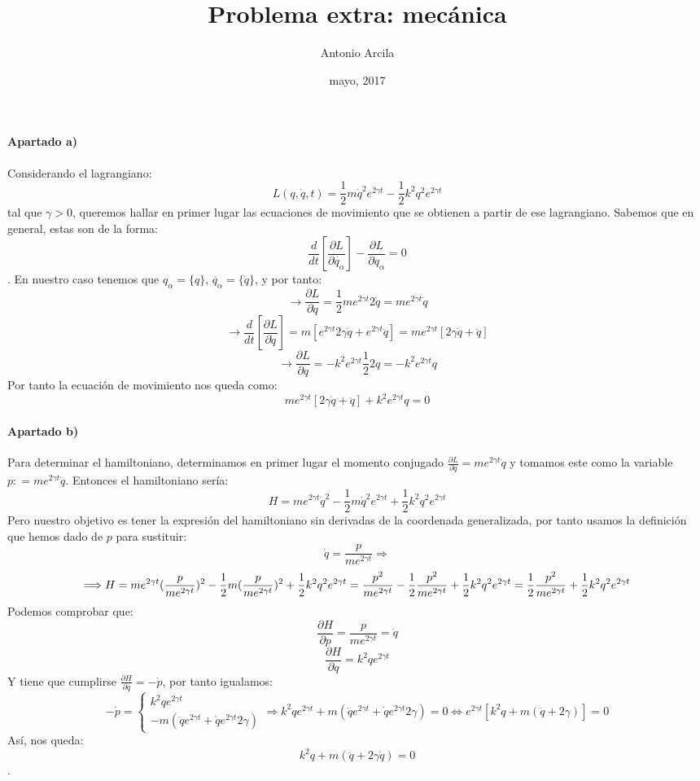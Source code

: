 \documentclass[11pt,a4paper]{article}
\title{Problema extra: mecánica}
\author{Antonio Arcila}
\date{mayo, 2017}
\begin{document}
	\maketitle
	\paragraph{Apartado a)}
	Considerando el lagrangiano: \[L(q,\dot{q},t)=\frac{1}{2}m\dot{q}^{2}e^{2\gamma t}-\frac{1}{2}k^{2}q^{2}e^{2\gamma t}\] tal que $\gamma > 0$, queremos hallar en primer lugar las ecuaciones de movimiento que se obtienen a partir de ese lagrangiano. Sabemos que en general, estas son de la forma: \[\frac{d}{dt}[\frac{\partial L}{\partial \dot{q_{\alpha}}}]-\frac{\partial L}{\partial q_{\alpha}}=0\]. En nuestro caso tenemos que $q_{\alpha}=\{q\}$, $\dot{q_{\alpha}}=\{\dot{q}\}$, y por tanto: 
	\[\rightarrow \frac{\partial L}{\partial\dot{q}}=\frac{1}{2}me^{2\gamma t}2\dot{q} = me^{2\gamma t}\dot{q}\]
	\[\rightarrow \frac{d}{dt}[\frac{\partial L}{\partial \dot{q}}] = m[e^{2\gamma t}2\gamma \dot{q}+e^{2\gamma t}\ddot{q}] = me^{2\gamma t}[2\gamma \dot{q}+\ddot{q}]
	\]
	\[\rightarrow \frac{\partial L}{\partial q} = -k^{2}e^{2\gamma t}\frac{1}{2}2q = -k^{2}e^{2\gamma t}q
	\]
	Por tanto la ecuación de movimiento nos queda como:
	\[me^{2\gamma t}[2\gamma\dot{q}+\ddot{q}]+k^{2}e^{2\gamma t}q = 0
	\]
	\paragraph{Apartado b)} Para determinar el hamiltoniano, determinamos en primer lugar el momento conjugado $\frac{\partial L}{\partial \dot{q}} = me^{2\gamma t}\dot{q}$ y tomamos este como la variable $p\colon = me^{2\gamma t}\dot{q}$. Entonces el hamiltoniano sería: \[ H = me^{2\gamma t}\dot{q}^{2}-\frac{1}{2}m\dot{q}^{2}e^{2\gamma t}+\frac{1}{2}k^{2}q^{2}e^{2\gamma t}
	\]
	Pero nuestro objetivo es tener la expresión del hamiltoniano sin derivadas de la coordenada generalizada, por tanto usamos la definición que hemos dado de $p$ para sustituir:
	\[\dot{q}=\frac{p}{me^{2\gamma t}} \Longrightarrow 
	\]
	\[\Longrightarrow H = me^{2\gamma t}(\frac{p}{me^{2\gamma t}})^{2}-\frac{1}{2}m(\frac{p}{me^{2\gamma t}})^{2}+\frac{1}{2}k^{2}q^{2}e^{2\gamma t} = \\ \frac{p^{2}}{me^{2\gamma t}}-\frac{1}{2}\frac{p^{2}}{me^{2\gamma t}}+\frac{1}{2}k^{2}q^{2}e^{2\gamma t} = \frac{1}{2}\frac{p^{2}}{me^{2\gamma t}}+\frac{1}{2}k^{2}q^{2}e^{2\gamma t}
	\]
	Podemos comprobar que:
	\[\frac{\partial H}{\partial p} = \frac{p}{me^{2\gamma t}} = \dot{q}
	\]
	\[\frac{\partial H}{\partial q} = k^{2}qe^{2\gamma t}
	\]
	Y tiene que cumplirse $\frac{\partial H}{\partial q} = -\dot{p}$, por tanto igualamos:
	\[-\dot{p}= \begin{cases}
	k^{2}qe^{2\gamma t}\\
	-m(\ddot{q}e^{2\gamma t}+\dot{q}e^{2\gamma t}2\gamma)
	\end{cases}
	\Longrightarrow 	k^{2}qe^{2\gamma t}+m(\ddot{q}e^{2\gamma t}+\dot{q}e^{2\gamma t}2\gamma)=0 \Longleftrightarrow e^{2\gamma t}[k^{2}q+m(\ddot{q}+2\gamma)]=0
	\]
	Así, nos queda:\[k^{2}q+m(\ddot{q}+2\gamma\dot{q})=0\].
	
\end{document}
